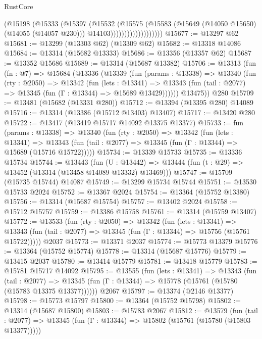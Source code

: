 \begin{lexlean}{RustCore}
\begin{coremodule}
                              (@15198
                                (@15333
                                  (@15397
                                    (@15532
                                      (@15575
                                        (@15583
                                          (@15649 (@14050 @15650) (@14055 (@14057 @230)))
                                          @14103)))))))))))))))))))
@15677 := @13297 @62
@15681 := @13299 (@13303 @62) (@13309 @62)
@15682 := @13318 @14086
@15684 := @13314 (@15682 @13333)
@15686 := @13356 (@13357 @62)
@15687 := @13352 @15686
@15689 := @13314 (@15687 @13382)
@15706 := @13313
    (fun (fn : @7) =>
    @15684
      (@13336
        (@13339
          (fun (params : @13338) =>
          @13340
            (fun (rty : @2050) =>
            @13342
              (fun (lets : @13341) =>
              @13343 (fun (tail : @2077) => @13345 (fun (Γ : @13344) => @15689 @13429))))))
        @13475))
    @280
@15709 := @13481 (@15682 (@13331 @280))
@15712 := @13394 (@13395 @280) @14089
@15716 := @13314 (@13386 (@15712 @13403) @13407)
@15717 := @13420 @280
@15722 := @13417 (@13419 @15717 @14092 @13375 @13377)
@15733 := fun (params : @13338) =>
  @13340
    (fun (rty : @2050) =>
    @13342
      (fun (lets : @13341) =>
      @13343 (fun (tail : @2077) => @13345 (fun (Γ : @13344) => @15689 (@15716 @15722)))))
@15734 := @13339 @15733
@15735 := @13336 @15734
@15744 := @13443
    (fun (U : @13442) => @13444 (fun (t : @29) => @13452 (@13314 (@13458 @14089 @13332) @13469)))
@15747 := @15709 (@15735 @15744) @14087
@15749 := @13299 @15734 @15744
@15751 := @13530 @15733 @2024
@15752 := @13367 @2024
@15754 := @13364 (@15752 @13380)
@15756 := @13314 (@15687 @15754)
@15757 := @13402 @2024
@15758 := @15712 @15757
@15759 := @13386 @15758
@15761 := @13314 (@15759 @13407)
@15772 := @13533
    (fun (rty : @2050) =>
    @13342
      (fun (lets : @13341) =>
      @13343 (fun (tail : @2077) => @13345 (fun (Γ : @13344) => @15756 (@15761 @15722)))))
    @2037
@15773 := @13371 @2037
@15774 := @15773 @13379
@15776 := @13364 (@15752 @15774)
@15778 := @13314 (@15687 @15776)
@15779 := @13415 @2037
@15780 := @13414 @15779
@15781 := @13418 @15779
@15783 := @15781 @15717 @14092
@15795 := @13555
    (fun (lets : @13341) =>
    @13343
      (fun (tail : @2077) =>
      @13345 (fun (Γ : @13344) => @15778 (@15761 (@15780 (@15783 @13375 @13377))))))
    @2067
@15797 := @13374 (@2146 @13377)
@15798 := @15773 @15797
@15800 := @13364 (@15752 @15798)
@15802 := @13314 (@15687 @15800)
@15803 := @15783 @2067
@15812 := @13579
    (fun (tail : @2077) => @13345 (fun (Γ : @13344) => @15802 (@15761 (@15780 (@15803 @13377)))))

\end{coremodule}
\end{lexlean}
